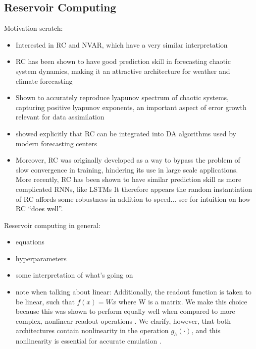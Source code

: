 \subsection{Reservoir Computing}
\label{subsec:rc}

Motivation scratch:
\begin{itemize}
    \item Interested in RC and NVAR, which have a very similar interpretation
    \item RC has been shown to have good prediction skill in forecasting chaotic
        system dynamics, making it an attractive architecture for weather and
        climate forecasting
    \item Shown to accurately reproduce lyapunov spectrum of chaotic systems,
        capturing positive lyapunov exponents, an important aspect of error
        growth relevant for data assimilation
    \item \citep{penny_integrating_2022} showed explicitly that RC can be
        integrated into DA algorithms used by modern forecasting centers
    \item Moreover,
        RC was originally developed as a way to bypass the problem of slow
        convergence in training, hindering its use in large scale applications.
        More recently,
        RC has been shown to have similar prediction skill as more
        complicated
        RNNs, like LSTMs \citep{vlachas_backpropagation_2020}
        It therefore appears the random instantiation of RC affords some
        robustness in addition to speed... see \citet{bollt_explaining_2021} for
        intuition on how RC ``does well''.
\end{itemize}

Reservoir computing in general:
\begin{itemize}
    \item equations
    \item hyperparameters
    \item some interpretation of what's going on
    \item note when talking about linear:
        Additionally, the readout function is taken to be linear, such that
        $f(x) = Wx$ where W is a matrix. We make this choice because
        this was shown to perform equally well when compared to more complex,
        nonlinear readout operations \citep{platt_systematic_2022}.
        We clarify, however, that both architectures contain nonlinearity in
        the operation $g_h(\cdot)$, and this nonlinearity is essential for
        accurate emulation  \citep{bollt_explaining_2021}.
\end{itemize}

